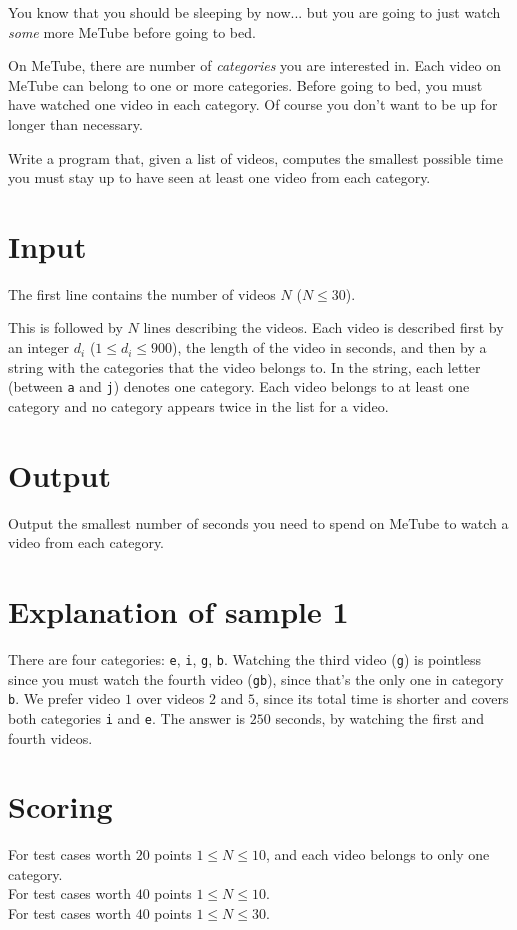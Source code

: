 You know that you should be sleeping by now... but you are going to just watch \emph{some} more MeTube before going to bed.

On MeTube, there are number of \emph{categories} you are interested in.
Each video on MeTube can belong to one or more categories.
Before going to bed, you must have watched one video in each category.
Of course you don't want to be up for longer than necessary.

Write a program that, given a list of videos, computes the smallest possible time you must stay up to have seen at least one video from each category.

\section*{Input}
The first line contains the number of videos $N$ ($N \le 30$).

This is followed by $N$ lines describing the videos.
Each video is described first by an integer $d_i$ ($1 \le d_i \le 900$), the length of the video in seconds, and then by a string with the categories that the video belongs to.
In the string, each letter (between \texttt{a} and \texttt{j}) denotes one category.
Each video belongs to at least one category and no category appears twice in the list for a video.

\section*{Output}
Output the smallest number of seconds you need to spend on MeTube to watch a video from each category.

\section*{Explanation of sample 1}
There are four categories: \texttt e, \texttt i, \texttt g, \texttt b.
Watching the third video (\texttt{g}) is pointless since you must watch the fourth video (\texttt{gb}), since that's the only one in category \texttt{b}.
We prefer video $1$ over videos $2$ and $5$, since its total time is shorter and covers both categories \texttt{i} and \texttt{e}.
The answer is $250$ seconds, by watching the first and fourth videos.

\section*{Scoring}
For test cases worth $20$ points $1 \le N \le 10$, and each video belongs to only one category.\\
For test cases worth $40$ points $1 \le N \le 10$.\\
For test cases worth $40$ points $1 \le N \le 30$.
